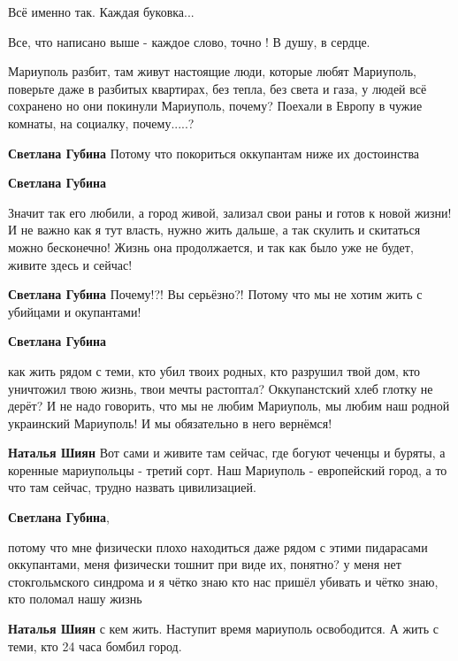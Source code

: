 Всё именно так. Каждая буковка...


Все, что написано выше - каждое слово, точно ! В душу, в сердце.


Мариуполь разбит, там живут настоящие люди, которые любят Мариуполь, поверьте
даже в разбитых квартирах, без тепла, без света и газа, у людей всё сохранено
но они покинули Мариуполь, почему? Поехали в Европу в чужие комнаты, на
социалку, почему.....?

\begin{itemize} %
\textbf{Светлана Губина} Потому что покориться оккупантам ниже их достоинства

\textbf{Светлана Губина} 

Значит так его любили, а город живой, зализал свои раны и готов к новой жизни! И
не важно как я тут власть, нужно жить дальше, а так скулить и скитаться можно
бесконечно! Жизнь она продолжается, и так как было уже не будет, живите здесь и
сейчас!

\textbf{Светлана Губина} Почему!?! Вы серьёзно?! Потому что мы не хотим жить с убийцами и окупантами!

\textbf{Светлана Губина} 

как жить рядом с теми, кто убил твоих родных, кто разрушил твой дом, кто
уничтожил твою жизнь, твои мечты растоптал? Оккупанстский хлеб глотку не дерёт?
И не надо говорить, что мы не любим Мариуполь, мы любим наш родной украинский
Мариуполь! И мы обязательно в него вернёмся!

\textbf{Наталья Шиян} Вот сами и живите там сейчас, где богуют чеченцы и буряты, а коренные мариупольцы - третий сорт.
Наш Мариуполь - европейский город, а то что там сейчас, трудно назвать цивилизацией.

\textbf{Светлана Губина},

потому что мне физически плохо находиться даже рядом с этими пидарасами
оккупантами, меня физически тошнит при виде их, понятно? у меня нет стокгольмского
синдрома и я чётко знаю кто нас пришёл убивать и чётко знаю, кто поломал нашу
жизнь

\textbf{Наталья Шиян} с кем жить. Наступит время мариуполь освободится. А жить с теми, кто 24 часа бомбил город.

\end{itemize} %

